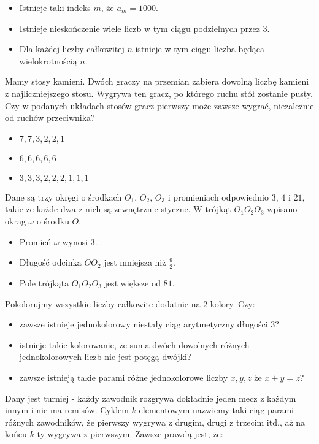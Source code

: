 \documentclass[12pt, a4paper]{article}
\newcommand{\question}[1]{\normalitem \begin{samepage}#1 \end{samepage}}
\newcommand{\questionwithasterix}[1]{ \asterixitem \begin{samepage}#1 \vspace{6cm}\end{samepage}}
\begin{document}
\begin{enumerate}
{		\begin{itemize}
			\item Istnieje taki indeks $m$, że $a_m=1000$.
			\item Istnieje nieskończenie wiele liczb w tym ciągu podzielnych przez $3$.
			\item Dla każdej liczby całkowitej $n$ istnieje w tym ciągu liczba będąca wielokrotnością $n$.
		\end{itemize}
	}
	
	\questionwithasterix {
		Mamy stosy kamieni. Dwóch graczy na przemian zabiera dowolną liczbę kamieni z najliczniejszego stosu. Wygrywa ten gracz, po którego ruchu stół zostanie pusty. Czy w podanych układach stosów gracz pierwszy może zawsze wygrać, niezależnie od ruchów przeciwnika?
	
		\begin{itemize}
			\item $7,7,3,2,2,1$
			\item $6,6,6,6,6$
			\item $3,3,3,2,2,2,1,1,1$ 
		\end{itemize}
	}
	
	\question {
		Dane są trzy okręgi o środkach $O_1$, $O_2$, $O_3$ i promieniach odpowiednio $3$, $4$ i $21$, takie że każde dwa z nich są zewnętrznie styczne. W trójkąt $O_1 O_2 O_3$ wpisano okrag $\omega$ o środku $O$.
	
		\begin{itemize}
			\item Promień $\omega$ wynosi $3$.
			\item Długość odcinka $OO_2$ jest mniejsza niż $\frac{9}{2}$.
			\item Pole trójkąta $O_1O_2O_3$ jest większe od $81$.
		\end{itemize}
	}
	
	\question {
		Pokolorujmy wszystkie liczby całkowite dodatnie na $2$ kolory. Czy:
	
		\begin{itemize}
			\item zawsze istnieje jednokolorowy niestały ciąg arytmetyczny długości $3$?
			\item istnieje takie kolorowanie, że suma dwóch dowolnych różnych jednokolorowych liczb nie jest potęgą dwójki?
			\item zawsze istnieją takie parami różne jednokolorowe liczby $x, y, z$ że $x+y=z$?
		\end{itemize}
	}
	
	\question {
		Dany jest turniej - każdy zawodnik rozgrywa dokładnie jeden mecz z każdym innym i nie ma remisów. Cyklem $k$-elementowym nazwiemy taki ciąg parami różnych zawodników, że pierwszy wygrywa z drugim, drugi z trzecim itd., aż na końcu $k$-ty wygrywa z pierwszym. Zawsze prawdą jest, że:
	
}
\end{enumerate}
\end{document}
